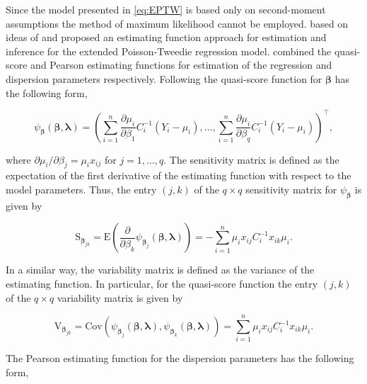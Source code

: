 \documentclass[9pt,a5paper,]{book}
\theoremstyle{definition}
\theoremstyle{definition}
\theoremstyle{remark}
\begin{document}
Since the model presented in \eqref{eq:EPTW} is based only on
second-moment assumptions the method of maximum likelihood cannot be
employed. \citet{Bonat2016b} based on ideas of \citet{Jorgensen2004} and
\citet{Bonat2016a} proposed an estimating function approach for
estimation and inference for the extended Poisson-Tweedie regression
model. \citet{Bonat2016b} combined the quasi-score and Pearson
estimating functions for estimation of the regression and dispersion
parameters respectively. Following \citet{Bonat2016b} the quasi-score
function for \(\boldsymbol{\beta}\) has the following form,

\begin{equation*}
\psi_{\boldsymbol{\beta}}(\boldsymbol{\beta}, \boldsymbol{\lambda}) = \left (\sum_{i=1}^n \frac{\partial \mu_i}{\partial \beta_1}C^{-1}_i(Y_i - \mu_i), \ldots, \sum_{i=1}^n \frac{\partial \mu_i}{\partial \beta_q}C^{-1}_i(Y_i - \mu_i)  \right )^\top,
\end{equation*}

where \(\partial \mu_i/\partial \beta_j = \mu_i x_{ij}\) for
\(j = 1, \ldots, q\). The sensitivity matrix is defined as the
expectation of the first derivative of the estimating function with
respect to the model parameters. Thus, the entry \((j,k)\) of the
\(q \times q\) sensitivity matrix for \(\psi_{\boldsymbol{\beta}}\) is
given by

\begin{equation}
\mathrm{S}_{\boldsymbol{\beta}_{jk}} = \mathrm{E}\left ( \frac{\partial}{\partial \beta_k} \psi_{\boldsymbol{\beta}_j}(\boldsymbol{\beta}, \boldsymbol{\lambda})  \right ) = -\sum_{i=1}^n \mu_i x_{ij} C^{-1}_i x_{ik} \mu_i.
\label{eq:Sbeta}
\end{equation}

In a similar way, the variability matrix is defined as the variance of
the estimating function. In particular, for the quasi-score function the
entry \((j,k)\) of the \(q \times q\) variability matrix is given by

\begin{equation*}
\label{Vbeta}
\mathrm{V}_{\boldsymbol{\beta}_{jk}} = \mathrm{Cov}(\psi_{\boldsymbol{\beta}_j}(\boldsymbol{\beta}, \boldsymbol{\lambda}),\psi_{\boldsymbol{\beta}_k}(\boldsymbol{\beta}, \boldsymbol{\lambda})) = \sum_{i=1}^n \mu_i x_{ij} C^{-1}_i x_{ik} \mu_i.
\end{equation*}

The Pearson estimating function for the dispersion parameters has the
following form,
\end{document}
